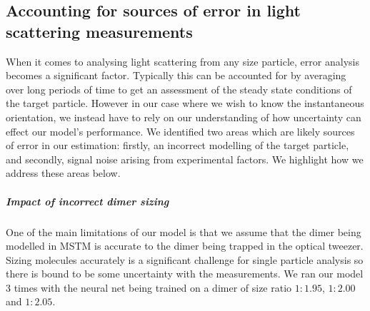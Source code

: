 \documentclass[12pt]{spieman}
\begin{document}
\begin{spacing}{1.5}
\subsection{Accounting for sources of error in light scattering measurements}
When it comes to analysing light scattering from any size particle, error analysis becomes a significant factor. Typically this can be accounted for by averaging over long periods of time to get an assessment of the steady state conditions of the target particle. However in our case where we wish to know the instantaneous orientation, we instead have to rely on our understanding of how uncertainty can effect our model's performance. We identified two areas which are likely sources of error in our estimation: firstly, an incorrect modelling of the target particle, and secondly, signal noise arising from experimental factors. We highlight how we address these areas below. 
\subparagraph{Impact of incorrect dimer sizing}
\label{sec:lam}

One of the main limitations of our model is that we assume that the dimer being modelled in MSTM is accurate to the dimer being trapped in the optical tweezer. Sizing molecules accurately is a significant challenge for single particle analysis so there is bound to be some uncertainty with the measurements. We ran our model 3 times with the neural net being trained on a dimer of size ratio $1:1.95$, $1:2.00$ and $1:2.05$.


\end{spacing}
\end{document}
